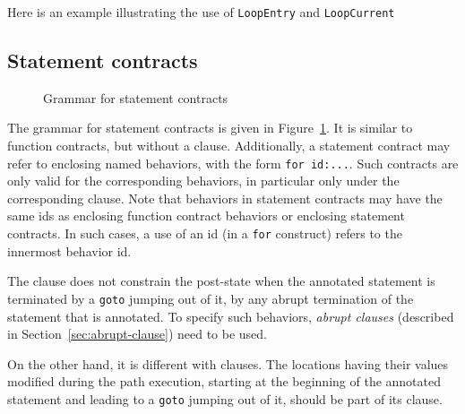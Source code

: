 \begin{example}
Here is an example illustrating the use of \lstinline|LoopEntry| and
\lstinline|LoopCurrent|

\end{example}

\subsection{Statement contracts}
\label{sec:statement_contract}
\begin{figure}[htp]
  \begin{cadre}
    
  \end{cadre}
  \caption{Grammar for statement contracts}
  \label{fig:gram:stcontracts}
\end{figure}

The grammar for statement contracts is given in
Figure~\ref{fig:gram:stcontracts}. It is similar to function
contracts, but without a \decreases{} clause. Additionally, a statement contract
may refer to enclosing named behaviors, with the form
\lstinline|for id:...|.
Such contracts are only valid for the
corresponding behaviors, in particular only under the
corresponding \assumes{} clause.
Note that behaviors in statement contracts may have the same ids as enclosing function contract behaviors
or enclosing statement contracts.
In such cases, a use of an id (in a \lstinline|for| construct) refers to the innermost behavior id.


The \ensures{} clause does not constrain the
post-state when the annotated statement is terminated
by a \lstinline|goto| jumping out of it,
by any abrupt termination of the statement that is annotated.
To specify such behaviors, \textsl{abrupt clauses} (described in
Section~\ref{sec:abrupt-clause}) need to be used.

On the other hand, it is different with \assigns{} clauses.
The locations having their values modified during the path execution, starting
at the beginning of the annotated statement and leading
to a \lstinline|goto| jumping out of it, should be part of its
\assigns clause.

